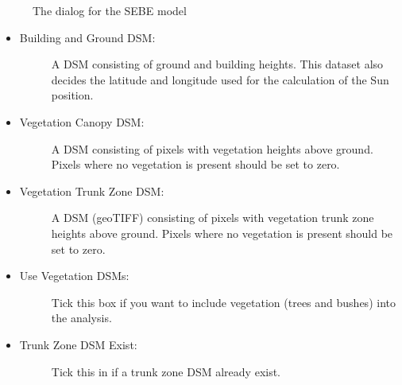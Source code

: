 \documentclass[letterpaper,10pt,english]{sphinxmanual}
\begin{document}
\begin{figure}[htbp]
\centering
\capstart

\noindent{}
\caption{The dialog for the SEBE model}\label{\detokenize{processor/Solar Radiation Solar Energy on Building Envelopes (SEBE):id1}}\end{figure}
\begin{itemize}
\item {} \begin{description}
\item[{Building and Ground DSM:}] \leavevmode
A DSM consisting of ground and building heights. This dataset also decides the latitude and longitude used for the calculation of the Sun position.

\end{description}

\item {} \begin{description}
\item[{Vegetation Canopy DSM:}] \leavevmode
A DSM consisting of pixels with vegetation heights above ground. Pixels where no vegetation is present should be set to zero.

\end{description}

\item {} \begin{description}
\item[{Vegetation Trunk Zone DSM:}] \leavevmode
A DSM (geoTIFF) consisting of pixels with vegetation trunk zone heights above ground. Pixels where no vegetation is present should be set to zero.

\end{description}

\item {} \begin{description}
\item[{Use Vegetation DSMs:}] \leavevmode
Tick this box if you want to include vegetation (trees and bushes) into the analysis.

\end{description}

\item {} \begin{description}
\item[{Trunk Zone DSM Exist:}] \leavevmode
Tick this in if a trunk zone DSM already exist.

\end{description}


\end{itemize}
\end{document}
